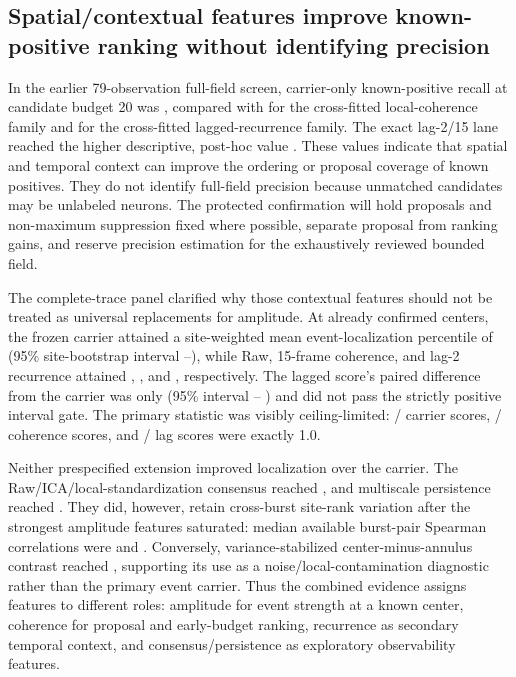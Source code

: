 \subsection{Spatial/contextual features improve known-positive ranking without identifying precision}

In the earlier 79-observation full-field screen, carrier-only known-positive
recall at candidate budget 20 was \CarrierRecallBtwenty{}, compared with
\CoherenceRecallBtwenty{} for the cross-fitted local-coherence family and
 for the cross-fitted lagged-recurrence family. The exact
lag-2/15 lane reached the higher descriptive, post-hoc value
\LagRecallBtwenty{}. These values indicate that spatial and temporal context can
improve the ordering or proposal coverage of known positives. They do not
identify full-field precision because unmatched candidates may be unlabeled
neurons. The protected confirmation will hold proposals and non-maximum
suppression fixed where possible, separate proposal from ranking gains, and
reserve precision estimation for the exhaustively reviewed bounded field.

The complete-trace panel clarified why those contextual features should not be
treated as universal replacements for amplitude. At already confirmed centers,
the frozen carrier attained a site-weighted mean event-localization percentile
of \FullTraceCarrierPercentile{} (95\% site-bootstrap interval
\FullTraceCarrierCILow{}--\FullTraceCarrierCIHigh{}), while Raw, 15-frame
coherence, and lag-2 recurrence attained \FullTraceRawPercentile{},
\FullTraceCoherencePercentile{}, and \FullTraceLagPercentile{}, respectively.
The lagged score's paired difference from the carrier was only
\FullTraceLagDelta{} (95\% interval \FullTraceLagDeltaLow{}--
\FullTraceLagDeltaHigh{}) and did not pass the strictly positive interval gate.
The primary statistic was visibly ceiling-limited: \FullTraceCarrierCeilingCount{}/
\FullTraceOccurrences{} carrier scores, \FullTraceCoherenceCeilingCount{}/
\FullTraceOccurrences{} coherence scores, and \FullTraceLagCeilingCount{}/
\FullTraceOccurrences{} lag scores were exactly 1.0.

Neither prespecified extension improved localization over the carrier. The
Raw/ICA/local-standardization consensus reached
\FullTraceConsensusPercentile{}, and multiscale persistence reached
\FullTracePersistencePercentile{}. They did, however, retain cross-burst
site-rank variation after the strongest amplitude features saturated: median
available burst-pair Spearman correlations were
\FullTraceConsensusRepeatability{} and
\FullTracePersistenceRepeatability{}. Conversely, variance-stabilized
center-minus-annulus contrast reached \FullTraceVSTPercentile{}, supporting its
use as a noise/local-contamination diagnostic rather than the primary event
carrier. Thus the combined evidence assigns features to different roles:
amplitude for event strength at a known center, coherence for proposal and
early-budget ranking, recurrence as secondary temporal context, and
consensus/persistence as exploratory observability features.

